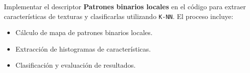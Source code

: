 Implementar el descriptor \textbf{Patrones binarios locales} en el
código para extraer características de texturas y clasificarlas
utilizando \texttt{K-NN}. El proceso incluye:

\begin{itemize}
    \item[$\alpha_1.$] Cálculo de mapa de patrones binarios locales.
    \item[$\alpha_2.$] Extracción de histogramas de características.
    \item[$\alpha_3.$] Clasificación y evaluación de resultados.
\end{itemize}